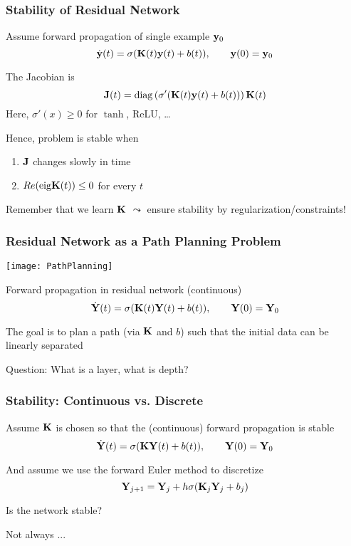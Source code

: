 \documentclass[12pt,fleqn,handout]{beamer}
\begin{document}
\begin{frame}
	\frametitle{Stability of Residual Network}
	
	Assume forward propagation of single example ${\bf y}_0$
	$$ \dot{{\bf y}}(t) = \sigma({\bf K}(t) {\bf y}(t) + b(t)), \quad \quad {\bf y}(0) = {\bf y}_0 $$
	
	\bigskip
	\pause
	
	The Jacobian is
	$$
	 {\bf J}(t) = {\rm diag}\left(\sigma'({\bf K}(t) {\bf y}(t) + b(t))\right) {\bf K}(t)
	$$
	Here, $\sigma'(x) \geq 0$ for $\tanh$, ReLU, \ldots
	
	\bigskip
	\pause
	
	Hence, problem is stable when
	\begin{enumerate}
		\item ${\bf J}$ changes slowly in time
		\item $Re({\rm eig}{\bf K}(t)) \leq 0$ for every $t$
	\end{enumerate}
	
	\pause
	
	\begin{center}
		Remember that we  learn ${\bf K}$ $\leadsto$ ensure stability by regularization/constraints!
	\end{center}
	
	
\end{frame}


\begin{frame}[fragile]\frametitle{Residual Network as a Path Planning Problem}


\begin{center}
	\texttt{[image: PathPlanning]}
\end{center}

\bigskip
\pause

Forward propagation in residual network (continuous)
$$ \dot{{\bf Y}}(t) = \sigma( {\bf K}(t) {\bf Y}(t) + b(t)), \qquad {\bf Y}(0) = {\bf Y}_0 $$

The goal is to plan a path (via ${\bf K}$ and $b$) such that the initial data can be linearly separated

\bigskip
\pause
Question: What is a layer, what is depth?


\end{frame}



\begin{frame}[fragile]\frametitle{Stability: Continuous vs. Discrete}


Assume ${\bf K}$ is chosen so that the (continuous) forward propagation is stable
$$ \dot{{\bf Y}}(t) = \sigma( {\bf K} {\bf Y}(t)+ b(t)), \qquad {\bf Y}(0) = {\bf Y}_0 $$

And assume we use the forward Euler method to discretize
$$ {\bf Y}_{j+1} = {\bf Y}_{j} + h \sigma( {\bf K}_j {\bf Y}_j + b_j) $$

Is the network stable?


\bigskip
\pause

Not always ...


\end{frame}
\end{document}
